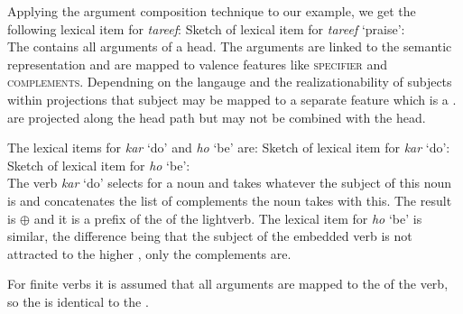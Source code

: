 Applying the argument composition technique to our example, we get the following lexical item for
\emph{tareef}:
\ea
Sketch of lexical item for \emph{tareef} `praise':\\
\z
The \argstl contains all arguments of a head. The arguments are linked to the semantic representation
and are mapped to valence features like \textsc{specifier} and \textsc{complements}. Dependning on
the langauge and the realizationability of subjects within projections that subject may be mapped to
a separate feature which is a \headf. \headfs are projected along the head path but may not be
combined with the head.

The lexical items for \emph{kar} `do' and  \emph{ho} `be' are:
\eal
\ex Sketch of lexical item for \emph{kar} `do':\\
\ex Sketch of lexical item for \emph{ho} `be':\\
\zl
The verb \emph{kar} `do' selects for a noun and takes whatever the subject of this noun is and 
concatenates the list of complements the noun takes with this. The result is  $\oplus$
 and it is a prefix of the \argstl of the lightverb. 
The lexical item for \emph{ho} `be' is similar, the difference being that the subject of the
embedded verb is not attracted to the higher \argstl, only the complements  are.

For finite verbs it is assumed that all arguments are mapped to the \compsl of the verb, so the
\compsl is identical to the \argstl.

